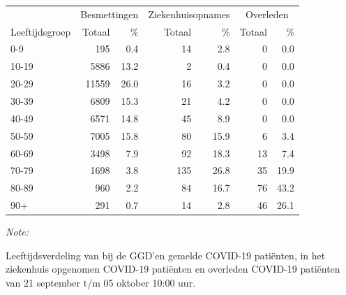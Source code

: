 \documentclass[
  english,
  man,floatsintext]{apa6}
\begin{document}
\begin{table}[H]
\centering\begingroup\fontsize{11}{13}\selectfont

\begin{threeparttable}
\begin{tabular}{lrrrrrr}
\toprule
\multicolumn{1}{c}{ } & \multicolumn{2}{c}{Besmettingen} & \multicolumn{2}{c}{Ziekenhuisopnames} & \multicolumn{2}{c}{Overleden} \\
\cmidrule(l{3pt}r{3pt}){2-3} \cmidrule(l{3pt}r{3pt}){4-5} \cmidrule(l{3pt}r{3pt}){6-7}
Leeftijdsgroep & Totaal & \% & Totaal & \% & Totaal & \%\\
\midrule
0-9 & 195 & 0.4 & 14 & 2.8 & 0 & 0.0\\
10-19 & 5886 & 13.2 & 2 & 0.4 & 0 & 0.0\\
20-29 & 11559 & 26.0 & 16 & 3.2 & 0 & 0.0\\
30-39 & 6809 & 15.3 & 21 & 4.2 & 0 & 0.0\\
40-49 & 6571 & 14.8 & 45 & 8.9 & 0 & 0.0\\
50-59 & 7005 & 15.8 & 80 & 15.9 & 6 & 3.4\\
60-69 & 3498 & 7.9 & 92 & 18.3 & 13 & 7.4\\
70-79 & 1698 & 3.8 & 135 & 26.8 & 35 & 19.9\\
80-89 & 960 & 2.2 & 84 & 16.7 & 76 & 43.2\\
90+ & 291 & 0.7 & 14 & 2.8 & 46 & 26.1\\
\bottomrule
\end{tabular}
\begin{tablenotes}
\item \textit{Note: } 
\item Leeftijdsverdeling van bij de GGD’en gemelde COVID-19 patiënten, in het ziekenhuis opgenomen COVID-19 patiënten en overleden COVID-19 patiënten van 21 september t/m 05 oktober 10:00 uur.
\end{tablenotes}
\end{threeparttable}
\endgroup{}
\end{table}
\end{document}
